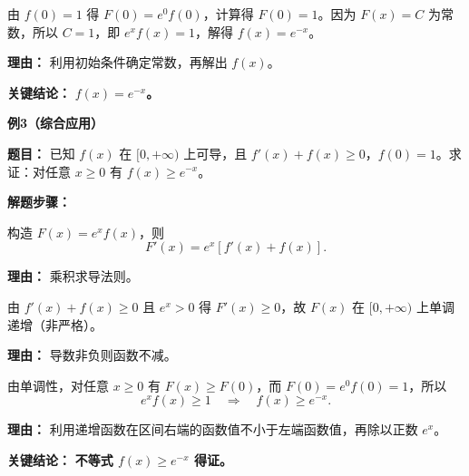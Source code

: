 \begin{examplebox}
\begin{description}[style=nextline, leftmargin=2.8em, labelsep=0.5em, itemsep=0.45em]
		\item[\textbf{第三步（代值求解）：}] 由 $f(0)=1$ 得 $F(0)=e^{0}f(0)$，计算得 $F(0)=1$。因为 $F(x)=C$ 为常数，所以 $C=1$，即 $e^{x}f(x)=1$，解得 $f(x)=e^{-x}$。
			\par\textbf{理由：} 利用初始条件确定常数，再解出 $f(x)$。
	\end{description}

	\textbf{\textcolor{CExample}{关键结论：}}
	\textbf{$f(x)=e^{-x}$。}

	\medskip
	\textbf{\textcolor{CExample}{例3（综合应用）}}

	\textbf{\textcolor{CExample}{题目：}}
	已知 $f(x)$ 在 $[0,+\infty)$ 上可导，且 $f'(x)+f(x)\ge 0$，$f(0)=1$。求证：对任意 $x\ge 0$ 有 $f(x)\ge e^{-x}$。

	\textbf{\textcolor{CExample}{解题步骤：}}
	\begin{description}[style=nextline, leftmargin=2.8em, labelsep=0.5em, itemsep=0.45em]
		\item[\textbf{第一步（构造求导）：}] 构造 $F(x)=e^{x}f(x)$，则
			\[
				F'(x)=e^{x}[f'(x)+f(x)].
			\]
			\par\textbf{理由：} 乘积求导法则。

		\item[\textbf{第二步（符号转化）：}] 由 $f'(x)+f(x)\ge 0$ 且 $e^{x}>0$ 得 $F'(x)\ge 0$，故 $F(x)$ 在 $[0,+\infty)$ 上单调递增（非严格）。
			\par\textbf{理由：} 导数非负则函数不减。

		\item[\textbf{第三步（单调应用）：}] 由单调性，对任意 $x\ge 0$ 有 $F(x)\ge F(0)$，而 $F(0)=e^{0}f(0)=1$，所以
			\[
				e^{x}f(x)\ge 1 \quad\Rightarrow\quad f(x)\ge e^{-x}.
			\]
			\par\textbf{理由：} 利用递增函数在区间右端的函数值不小于左端函数值，再除以正数 $e^{x}$。
	\end{description}

	\textbf{\textcolor{CExample}{关键结论：}}
	\textbf{不等式 $f(x)\ge e^{-x}$ 得证。}
\end{examplebox}
